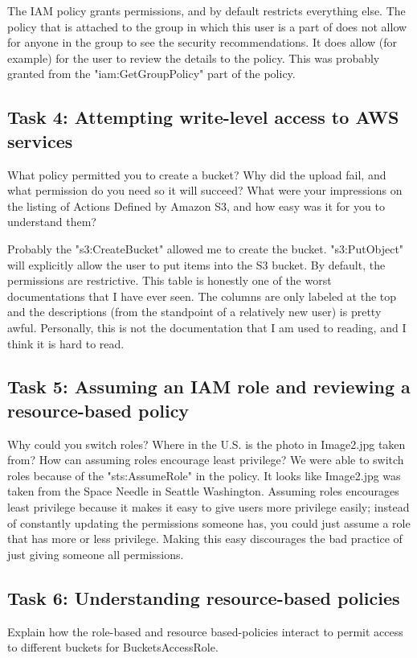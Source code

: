 \documentclass[11pt]{article}
\begin{document}
The IAM policy grants permissions, and by default restricts everything else. The policy that is attached to the group in which this user is a part of does not allow for anyone in the group to see the security recommendations. It does allow (for example) for the user to review the details to the policy. This was probably granted from the "iam:GetGroupPolicy" part of the policy.


\subsection*{Task 4: Attempting write-level access to AWS services}
What policy permitted you to create a bucket? Why did the upload fail, and what permission do you need so it will succeed? What were your impressions on the listing of Actions Defined by Amazon S3, and how easy was it for you to understand them?

Probably the "s3:CreateBucket" allowed me to create the bucket. "s3:PutObject" will explicitly allow the user to put items into the S3 bucket. By default, the permissions are restrictive. This table is honestly one of the worst documentations that I have ever seen. The columns are only labeled at the top and the descriptions (from the standpoint of a relatively new user) is pretty awful. Personally, this is not the documentation that I am used to reading, and I think it is hard to read.


\subsection*{Task 5: Assuming an IAM role and reviewing a resource-based policy}
Why could you switch roles? Where in the U.S. is the photo in Image2.jpg taken from? How can assuming roles encourage least privilege?
We were able to switch roles because of the "sts:AssumeRole" in the policy. It looks like Image2.jpg was taken from the Space Needle in Seattle Washington. Assuming roles encourages least privilege because it makes it easy to give users more privilege easily; instead of constantly updating the permissions someone has, you could just assume a role that has more or less privilege. Making this easy discourages the bad practice of just giving someone all permissions.


\subsection*{Task 6: Understanding resource-based policies}
Explain how the role-based and resource based-policies interact to permit access to different buckets for BucketsAccessRole.
\end{document}
